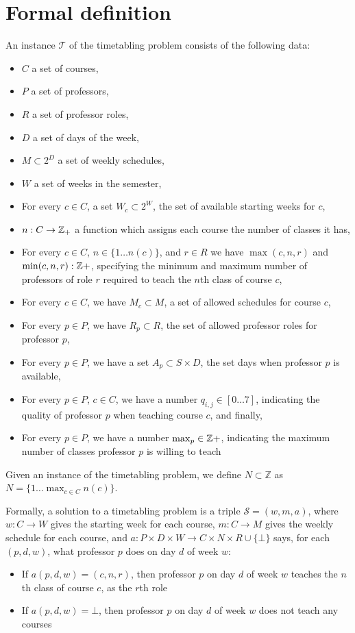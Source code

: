 \section{Formal definition}
An instance $\mathcal{T}$ of the timetabling problem consists of the following data:

\begin{itemize}
\item $C$ a set of courses,
\item $P$ a set of professors,
\item $R$ a set of professor roles,
\item $D$ a set of days of the week,
\item $M \subset 2^D$ a set of weekly schedules,
\item $W$ a set of weeks in the semester,
\item For every $c \in C$, a set $W_c \subset 2^W$, the set of available starting weeks for $c$,
\item $n: C \to \mathbb{Z}_+$ a function which assigns each course the number of classes it has,
\item For every $c \in C$, $n \in \{1 \dots n(c)\}$, and $r \in R$ we have $\max(c, n, r)$ and $\min(c, n, r): \mathbb{Z}+$, specifying the minimum and maximum number of professors of role $r$ required to teach the $n$th class of course $c$,
\item For every $c \in C$, we have $M_c \subset M$, a set of allowed schedules for course $c$,
\item For every $p \in P$, we have $R_p \subset R$, the set of allowed professor roles for professor $p$,
\item For every $p \in P$, we have a set $A_p \subset S \times D$, the set days when professor $p$ is available,
\item For every $p \in P$, $c \in C$, we have a number $q_{i, j} \in [0 \dots 7]$, indicating the quality of professor $p$ when teaching course $c$, and finally,
\item For every $p \in P$, we have a number $\max_p \in \mathbb{Z}+$, indicating the maximum number of classes professor $p$ is willing to teach
\end{itemize}


Given an instance of the timetabling problem, we define $N \subset \mathbb{Z}$ as $N = \{1 \dots \max_{c \in C} n(c)\}$.



Formally, a solution to a timetabling problem is a triple $\mathcal{S} = (w, m, a)$, where $w: C \to W$ gives the starting week for each course, $m: C \to M$ gives the weekly schedule for each course, and $a: P \times D \times W \to C \times N \times R \cup \{\bot\}$ says, for each $(p, d, w)$, what professor $p$ does on day $d$ of week $w$:
\begin{itemize}
\item If $a(p, d, w) = (c, n, r)$, then professor $p$ on day $d$ of week $w$ teaches the $n$th class of course $c$, as the $r$th role
\item If $a(p, d, w) = \bot$, then professor $p$ on day $d$ of week $w$ does not teach any courses
\end{itemize}

